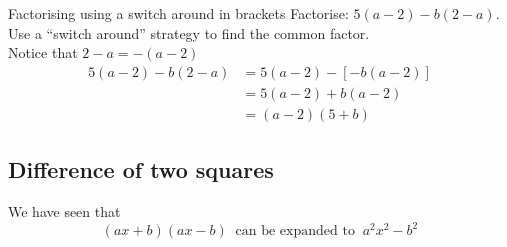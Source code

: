 % 

\begin{wex}{Factorising using a switch around in brackets }{Factorise: $5(a-2)-b(2-a)$. }
{
Use a ``switch around'' strategy to find the common factor. \\Notice that $2-a = -(a-2)$ 
\begin{align*}
  5(a-2)-b(2-a) &= 5(a-2)-[-b(a-2)] \\
  &= 5(a-2)+b(a-2) \\
  &= (a-2)(5+b)
\end{align*}
}
\end{wex}
% 
% 

\subsection* {Difference of two squares}
We have seen that 
\begin{equation*}
(ax+b)(ax-b)~\mbox{ can be expanded to }~{a}^{2}{x}^{2}-{b}^{2}
\end{equation*}

